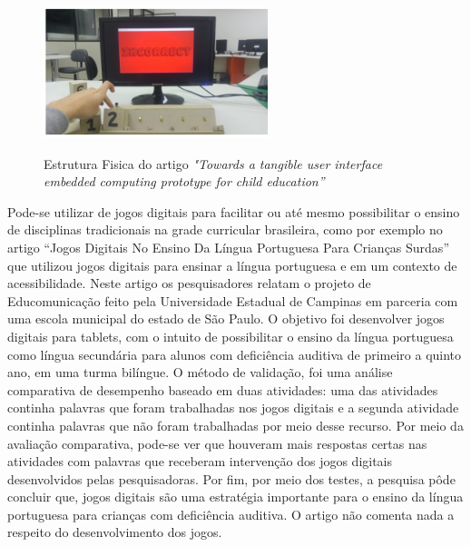 \begin{figure}[H]
    \caption{Estrutura Fisica do artigo \textit{"Towards a tangible user interface embedded computing prototype for child education”}}
    \centering
        \includegraphics[width=\linewidth]{Imagens/cap2/estrutura_artigo_towards.png}
    \label{figura:estrutura_artigo_towards}
\end{figure}

Pode-se utilizar de jogos digitais para facilitar ou até mesmo possibilitar o ensino de disciplinas tradicionais na grade curricular brasileira, como por exemplo no artigo “Jogos Digitais No Ensino Da Língua Portuguesa Para Crianças Surdas” \cite{liz_2017} que utilizou jogos digitais para ensinar a língua portuguesa e em um contexto de acessibilidade. Neste artigo os pesquisadores relatam o projeto de Educomunicação feito pela Universidade Estadual de Campinas em parceria com uma escola municipal do estado de São Paulo. O objetivo foi desenvolver jogos digitais para tablets, com o intuito de possibilitar o ensino da língua portuguesa como língua secundária para alunos com deficiência auditiva de primeiro a quinto ano, em uma turma bilíngue. O método de validação, foi uma análise comparativa de desempenho baseado em duas atividades: uma das atividades continha palavras que foram trabalhadas nos jogos digitais e a segunda atividade continha palavras que não foram trabalhadas por meio desse recurso. Por meio da avaliação comparativa, pode-se ver que houveram mais respostas certas nas atividades com palavras que receberam intervenção dos jogos digitais desenvolvidos pelas pesquisadoras. Por fim, por meio dos testes, a  pesquisa pôde concluir que, jogos digitais são uma estratégia importante para o ensino da língua portuguesa para crianças com deficiência auditiva. O artigo não comenta nada a respeito do desenvolvimento dos jogos.

